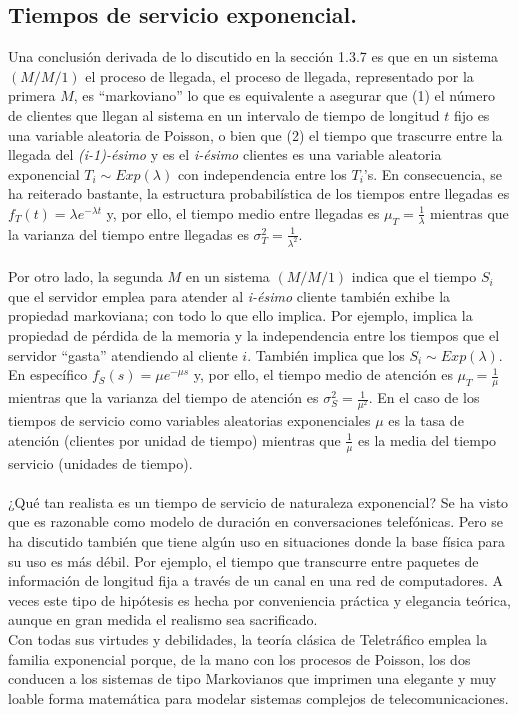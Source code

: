 \subsection{Tiempos de servicio exponencial.}
Una conclusión derivada de lo discutido en la sección 1.3.7 es que en un sistema $ \left ( M/M/1 \right ) $
el proceso de llegada, el proceso de llegada, representado por la primera $ M $, es “markoviano” lo que es equivalente a asegurar que (1) el número de clientes que llegan al sistema en un intervalo de tiempo de longitud $ t $ fijo es una variable aleatoria de Poisson, o bien que (2) el tiempo que trascurre entre la llegada del {\em (i-1)-ésimo } y es el {\em i-ésimo } clientes es una variable aleatoria exponencial $ T_{i}\sim Exp\left ( \lambda \right ) $ con independencia entre los $ T_{i} $'s. En consecuencia, se ha reiterado bastante, la estructura probabilística de los tiempos entre llegadas es $ f_{T}\left ( t \right )=\lambda e^{-\lambda t} $ y, por ello, el tiempo medio entre llegadas es $ \mu _{T}=\frac{1}{\lambda} $ mientras que la varianza del tiempo entre llegadas es $ \sigma _{T}^{2}=\frac{1}{\lambda^{2}} $. 
\\
\\
Por otro lado, la segunda $ M $ en un sistema $ \left ( M/M/1 \right ) $ indica que el tiempo $ S_{i} $ que el servidor emplea para atender al {\em i-ésimo } cliente también exhibe la propiedad markoviana; con todo lo que
ello implica. Por ejemplo, implica la propiedad de pérdida de la memoria y la independencia entre los tiempos que el servidor “gasta” atendiendo al cliente $ i $. También implica que los $ S_{i}\sim Exp\left ( \lambda \right ) $. En específico $ f_{S}\left ( s \right )=\mu e^{-\mu s} $ y, por ello, el tiempo medio de atención es $ \mu _{T}=\frac{1}{\mu} $ mientras que la varianza del tiempo de atención es $ \sigma _{S}^{2}=\frac{1}{\mu^{2}} $. En el caso de los tiempos de servicio como variables aleatorias exponenciales $ \mu $ es la tasa de atención (clientes por unidad de tiempo) mientras que $ \frac{1}{\mu} $ es la media del tiempo servicio (unidades de tiempo).
\\
\\
¿Qué tan realista es un tiempo de servicio de naturaleza exponencial? Se ha visto que es razonable como modelo de duración en conversaciones telefónicas. Pero se ha discutido también que tiene algún uso en situaciones donde la base física para su uso es más débil. Por ejemplo, el tiempo que transcurre entre paquetes de información de longitud fija a través de un canal en una red de computadores. A veces este tipo de hipótesis es hecha por conveniencia práctica y elegancia teórica, aunque en gran medida el realismo sea sacrificado.
\\
Con todas sus virtudes y debilidades, la teoría clásica de Teletráfico emplea la familia exponencial porque, de la mano con los procesos de Poisson, los dos conducen a los sistemas de tipo Markovianos que imprimen una elegante y muy loable forma matemática para modelar sistemas complejos de telecomunicaciones.

